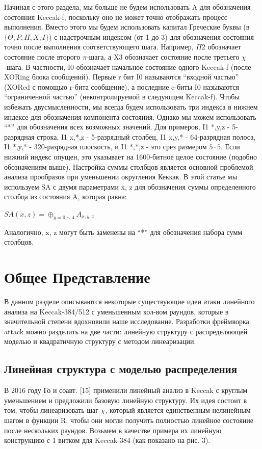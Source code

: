 \documentclass[utf8,14pt,a4paper,oneside,russian]{book}
\begin{document}
Начиная с этого раздела, мы больше не будем использовать A для обозначения состояния Keccak-f,
поскольку оно не может точно отображать процесс выполнения. Вместо этого мы будем использовать капитал
Греческие буквы (в $\{\Theta, P, \Pi, X, I\}$) с надстрочным индексом (от 1 до 3) для обозначения
состояния точно после выполнения соответствующего шага. Например, $\Pi$2 обозначает
состояние после второго $\pi$-шага, а X3 обозначает состояние после третьего $\chi$-шага.
В частности, I0 обозначает начальное состояние одного Keccak-f (после XORing блока
сообщений). Первые r бит I0 называются “входной частью” (XORed с помощью r-бита
сообщение), а последние c-биты I0 называются “ограниченной частью” (неконтролируемой
в следующем Keccak-f). Чтобы избежать двусмысленности, мы всегда будем использовать три индекса в
нижнем индексе для обозначения компонента состояния. Однако мы можем использовать “*” для обозначения всех возможных значений.
Для примеров, I1 *,y,z - 5-разрядная строка, I1 x,*,z - 5-разрядный столбец, I1 x,y,* - 64-разрядная полоса,
I1 *,y,* - 320-разрядная плоскость, и I1 *,*,z - это срез размером $5 \cdot 5$. Если нижний индекс опущен, это
указывает на 1600-битное целое состояние (подобно обозначениям выше).
Настройка суммы столбцов является основной проблемой анализа прообразов при уменьшении округления
Кеккак. В этой статье мы используем SA с двумя параметрами x, z для обозначения суммы
определенного столбца из состояния A, которая равна:

$SA(x, z) = \oplus _{y=0\sim4} A_{x,y,z}$

Аналогично, x, z могут быть заменены на “*” для обозначения набора сумм столбцов.

\newpage
\section{Общее Представление}

В данном разделе описываются некоторые существующие идеи атаки линейного анализа на Keccak-384/512 с уменьшенным кол-вом раундов,
которые в значительной степени вдохновили наше исследование. Разработки фреймворка attack можно разделить на две части:
линейную структуру с распределяющей моделью и квадратичную структуру с методом линеаризации.

\subsection*{Линейная структура с моделью распределения}

В 2016 году Го и соавт. [15] применили линейный анализ в Keccak с круглым уменьшением и
предложили базовую линейную структуру. Их идея состоит в том, чтобы линеаризовать шаг $\chi$, который является
единственным нелинейным шагом в функции R, чтобы они могли получить полностью линейное
состояние после нескольких раундов. Возьмем в качестве примера их линейную конструкцию с 1 витком для Keccak-384
(как показано на рис. 3).
\end{document}
